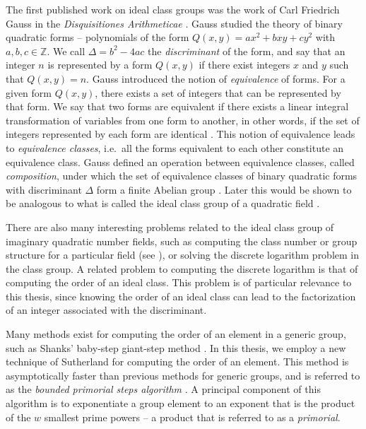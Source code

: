 \documentclass{ucalgthes1}
\theoremstyle{definition}
\newcommand{\ZZ}{\mathbb{Z}}
\begin{document}
The first published work on ideal class groups was the work of Carl Friedrich Gauss in the \emph{Disquisitiones Arithmeticae} \cite{Gauss1986}.  Gauss studied the theory of binary quadratic forms -- polynomials of the form $Q(x, y) = ax^2 + bxy + cy^2$ with $a, b, c \in \ZZ$.   We call $\Delta = b^2 - 4ac$ the \emph{discriminant} of the form, and say that an integer $n$ is represented by a form $Q(x, y)$ if there exist integers $x$ and $y$ such that $Q(x, y) = n$.  Gauss introduced the notion of \emph{equivalence} of forms.  For a given form $Q(x, y)$, there exists a set of integers that can be represented by that form.  We say that two forms are equivalent if there exists a linear integral transformation of variables from one form to another, in other words, if the set of integers represented by each form are identical \cite[p.239]{Crandall2001}.  This notion of equivalence leads to \emph{equivalence classes}, i.e.\ all the forms equivalent to each other constitute an equivalence class.  Gauss defined an operation between equivalence classes, called \emph{composition}, under which the set of equivalence classes of binary quadratic forms with discriminant $\Delta$ form a finite Abelian group \cite[p.136]{Cohn1980}.  Later this would be shown to be analogous to what is called the ideal class group of a quadratic field \cite{Frolich1993}.

There are also many interesting problems related to the ideal class group of imaginary quadratic number fields, such as computing the class number or group structure for a particular field (see \cite{Ramachandran2006}), or solving the discrete logarithm problem in the class group.  A related problem to computing the discrete logarithm is that of computing the order of an ideal class.  This problem is of particular relevance to this thesis, since knowing the order of an ideal class can lead to the factorization of an integer associated with the discriminant.

Many methods exist for computing the order of an element in a generic group, such as Shanks' baby-step giant-step method \cite{Shanks1971}.  In this thesis, we employ a new technique of Sutherland \cite{Sutherland2007} for computing the order of an element.  This method is asymptotically faster than previous methods for generic groups, and is referred to as the \emph{bounded primorial steps algorithm} \cite[\S 4.1]{Sutherland2007}.  A principal component of this algorithm is to exponentiate a group element to an exponent that is the product of the $w$ smallest prime powers -- a product that is referred to as a \emph{primorial}.
\end{document}
